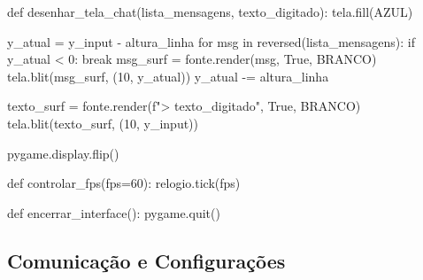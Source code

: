 \begin{itemize}
\begin{pycode}
			def desenhar_tela_chat(lista_mensagens, texto_digitado):
			tela.fill(AZUL)
			
			y_atual = y_input - altura_linha
			for msg in reversed(lista_mensagens):
			if y_atual < 0:
			break
			msg_surf = fonte.render(msg, True, BRANCO)
			tela.blit(msg_surf, (10, y_atual))
			y_atual -= altura_linha
			
			texto_surf = fonte.render(f"> {texto_digitado}", True, BRANCO)
			tela.blit(texto_surf, (10, y_input))
			
			pygame.display.flip()
			
			def controlar_fps(fps=60):
			relogio.tick(fps)
			
			def encerrar_interface():
			pygame.quit()
			
		\end{pycode}
	\end{itemize}
	
	
	\subsection*{Comunicação e Configurações}
	
